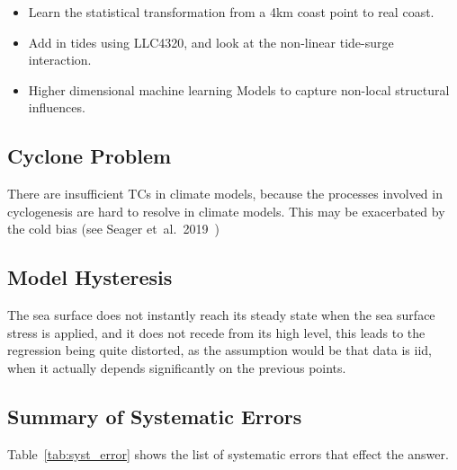 \begin{itemize}
\item Learn the statistical transformation from
      a 4km coast point to real coast.
\item Add in tides using LLC4320, and look at the
      non-linear tide-surge interaction.
\item Higher dimensional machine learning Models
      to capture non-local structural influences.
\end{itemize}

\subsection{Cyclone Problem}
There are insufficient TCs in climate models, because the processes involved
in cyclogenesis are hard to resolve in climate models. This may be
exacerbated by the cold bias (see Seager et~al.~2019~\cite{seager2019strengthening})

\subsection{Model Hysteresis}
The sea surface does not instantly reach its steady state when the sea surface
stress is applied, and it does not recede from its high level, this leads
to the regression being quite distorted, as the assumption would be that data
is iid, when it actually depends significantly on the previous points.


\subsection{Summary of Systematic Errors}
\label{sec:sys-errors}
Table~\ref{tab:syst_error} shows the list of systematic errors that effect the
answer.


